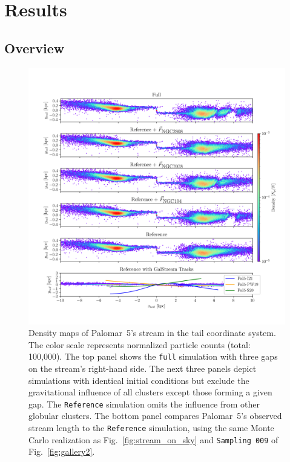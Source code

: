 \documentclass{aa}
\begin{document}
\section{Results}



  \subsection{Overview}

    \begin{figure}
      \centering
      \includegraphics[width=\linewidth]{decomposition-monte-carlo-009-with-3-gaps-domidpoint-shift.png}
      \caption{Density maps of Palomar~5's stream in the tail coordinate system. The color scale represents normalized particle counts (total: 100,000). The top panel shows the \texttt{full} simulation with three gaps on the stream's right-hand side. The next three panels depict simulations with identical initial conditions but exclude the gravitational influence of all clusters except those forming a given gap. The \texttt{Reference} simulation omits the influence from other globular clusters. The bottom panel compares Palomar~5's observed stream length to the \texttt{Reference} simulation, using the same Monte Carlo realization as Fig.~\ref{fig:stream_on_sky} and \texttt{Sampling~009} of Fig.~\ref{fig:gallery2}.}
      \label{fig:decomposition}
    \end{figure} 
    
\end{document}
